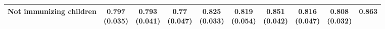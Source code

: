 {\begin{tabular}[t]{lccccccccc}
\hspace{1em}Not immunizing children & \makecell[c]{0.797\\(0.035)} & \makecell[c]{0.793\\(0.041)} & \makecell[c]{0.77\\(0.047)} & \makecell[c]{0.825\\(0.033)} & \makecell[c]{0.819\\(0.054)} & \makecell[c]{0.851\\(0.042)} & \makecell[c]{0.816\\(0.047)} & \makecell[c]{0.808\\(0.032)} & 0.863\\
\bottomrule
\end{tabular}}

